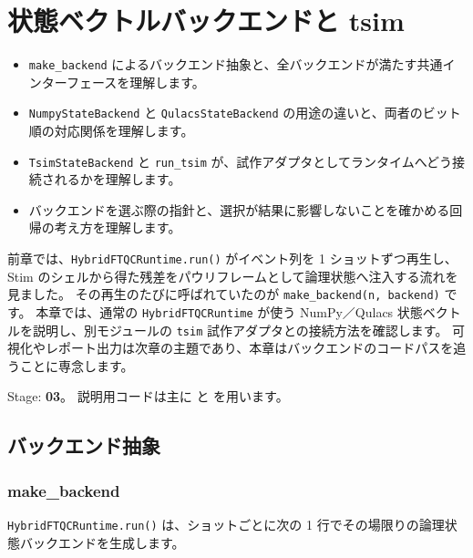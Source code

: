 \chapter{状態ベクトルバックエンドと tsim}\label{ch:backends_tsim}

\begin{chaptergoal}
  \begin{itemize}
  \item \texttt{make\_backend} によるバックエンド抽象と、全バックエンドが満たす共通インターフェースを理解します。
  \item \texttt{NumpyStateBackend} と \texttt{QulacsStateBackend} の用途の違いと、両者のビット順の対応関係を理解します。
  \item \texttt{TsimStateBackend} と \texttt{run\_tsim} が、試作アダプタとしてランタイムへどう接続されるかを理解します。
  \item バックエンドを選ぶ際の指針と、選択が結果に影響しないことを確かめる回帰の考え方を理解します。
  \end{itemize}
\end{chaptergoal}

前章では、\texttt{HybridFTQCRuntime.run()} がイベント列を 1 ショットずつ再生し、Stim のシェルから得た残差をパウリフレームとして論理状態へ注入する流れを見ました。
その再生のたびに呼ばれていたのが \texttt{make\_backend(n, backend)} です。
本章では、通常の \texttt{HybridFTQCRuntime} が使う NumPy／Qulacs 状態ベクトルを説明し、別モジュールの \texttt{tsim} 試作アダプタとの接続方法を確認します。
可視化やレポート出力は次章の主題であり、本章はバックエンドのコードパスを追うことに専念します。

\begin{notebox}
  Stage: \textbf{03}。
  説明用コードは主に  と  を用います。
\end{notebox}

\section{バックエンド抽象}\label{sec:backend_abs}

\subsection{make\_backend}

\texttt{HybridFTQCRuntime.run()} は、ショットごとに次の 1 行でその場限りの論理状態バックエンドを生成します。


